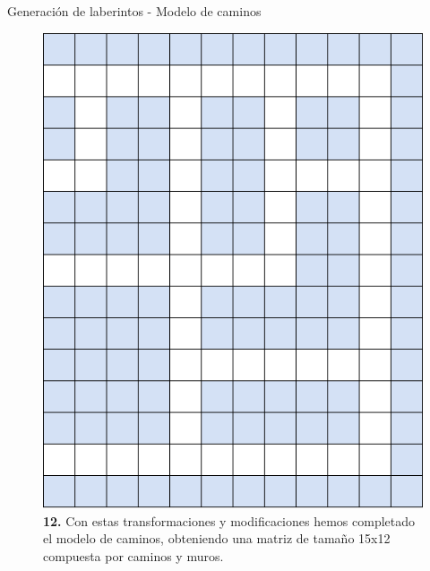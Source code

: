 \documentclass{beamer}
\begin{document}
    \begin{frame}{Generación de laberintos - Modelo de caminos \scriptsize{\hfill \secname}}
        \begin{figure}[H]
        \centering
            \includegraphics[scale=0.275]{img/paso12.png}
            \caption{\textbf{12.} Con estas transformaciones y modificaciones hemos completado el modelo de caminos, obteniendo una matriz de tamaño 15x12 compuesta por caminos y muros.}
        \end{figure}
    \end{frame}
    
\end{document}
